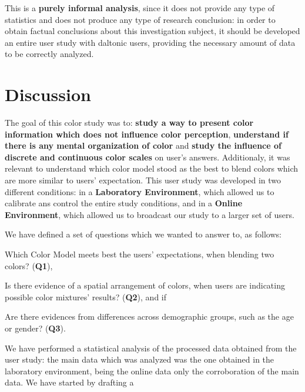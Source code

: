 %
This is a \textbf{purely informal analysis}, since it does not provide any type of statistics and does not produce any type of research conclusion: in order to obtain factual conclusions about this investigation subject, it should be developed an entire user study with daltonic users, providing the necessary amount of data to be correctly
analyzed.
%
%
\section{Discussion}
\label{sec:results_discussion}
%
The goal of this color study was to: \textbf{study a way to present color information which does not influence color perception}, \textbf{understand if there is any mental organization of color} and \textbf{study the influence of discrete and continuous color scales} on
user's answers. Additionaly, it was relevant to understand which color model stood as the best to blend colors which are more similar to users' expectation. This user study was developed in two different conditions: in a \textbf{Laboratory Environment}, which allowed us
to calibrate ans control the entire study conditions, and in a \textbf{Online Environment}, which allowed us to broadcast our study to a larger set of users. \par
%
We have defined a set of questions which we wanted to answer to, as follows:
%
\begin{enumerate*}
	\item Which Color Model meets best the users' expectations, when blending two colors? (\textbf{Q1}),
	\item Is there evidence of a spatial arrangement of colors, when users are indicating possible color mixtures' results? (\textbf{Q2}), and if
	\item Are there evidences from differences across demographic groups, such as the age or gender? (\textbf{Q3}).
\end{enumerate*}
%
We have performed a statistical analysis of the processed data obtained from the user study: the main data which was analyzed was the one obtained in the laboratory environment, being the online data only the corroboration of the main data. We have started by drafting a
